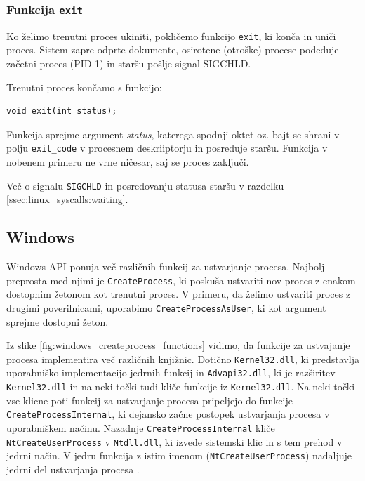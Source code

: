 \documentclass[a4paper,12pt,openright]{book}
\begin{document}
\subsubsection{Funkcija \texttt{exit}}

Ko želimo trenutni proces ukiniti, pokličemo funkcijo \texttt{exit}, ki konča in uniči proces.
Sistem zapre odprte dokumente, osirotene (otroške) procese podeduje začetni proces (PID 1) in staršu pošlje signal SIGCHLD.

Trenutni proces končamo s funkcijo:
\begin{lstlisting}[style=func]
 void exit(int status);
\end{lstlisting}

Funkcija sprejme argument \textit{status}, katerega spodnji oktet oz. bajt se shrani v polju \texttt{exit\_code} v procesnem deskriiptorju in posreduje staršu.
Funkcija v nobenem primeru ne vrne ničesar, saj se proces zaključi.

Več o signalu \texttt{SIGCHLD} in posredovanju statusa staršu v razdelku \ref{ssec:linux_syscalls:waiting}.

\subsection{Windows}

Windows API ponuja več različnih funkcij za ustvarjanje procesa.
Najbolj preprosta med njimi je \texttt{CreateProcess}, ki poskuša ustvariti nov proces z enakom dostopnim žetonom kot trenutni proces.
V primeru, da želimo ustvariti proces z drugimi poverilnicami, uporabimo \texttt{CreateProcessAsUser}, ki kot argument sprejme dostopni žeton.

Iz slike \ref{fig:windows_createprocess_functions} vidimo, da funkcije za ustvajanje procesa implementira več različnih knjižnic.
Dotično \texttt{Kernel32.dll}, ki predstavlja uporabniško implementacijo jedrnih funkcij in \texttt{Advapi32.dll}, ki je razširitev \texttt{Kernel32.dll} in na neki točki tudi kliče funkcije iz \texttt{Kernel32.dll}.
Na neki točki vse klicne poti funkcij za ustvarjanje procesa pripeljejo do funkcije \texttt{CreateProcess\-Internal}, ki dejansko začne postopek ustvarjanja procesa v uporabniškem načinu.
Nazadnje \texttt{CreateProcessInternal} kliče \texttt{NtCreateUserProcess} v \texttt{Ntdll.dll}, ki izvede sistemski klic in s tem prehod v jedrni način.
V jedru funkcija z istim imenom (\texttt{NtCreateUserProcess}) nadaljuje jedrni del ustvarjanja procesa \cite{Yosifovich_Russinovich_Solomon_Ionescu_2017}.
\end{document}
